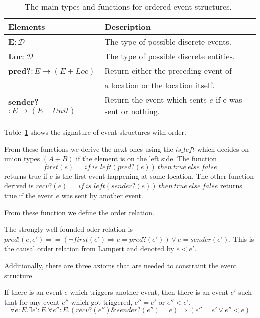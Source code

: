 \begin{table}[h]
  \centering
  \begin{tabular}{l|l}
    Elements & Description\\\hline
    \textbf{E}$:\mathcal{D}$ & The type of possible discrete events.\\
    \textbf{Loc}$:\mathcal{D}$ & The type of possible discrete entities.\\
    \textbf{pred?}$:E\rightarrow (E+Loc)$
             & Return either the preceding event of\\
             & a location or the location itself.\\
    \textbf{sender?}$:E\rightarrow (E+Unit)$
             & Return the event which sents $e$ if e was sent or nothing.\\
  \end{tabular}
  \caption{The main types and functions for ordered event structures.~\cite{bickford2005causal}}
  \label{tab:eorder}
\end{table}

Table~\ref{tab:eorder} shows the signature of event structures with order.

From these functions we derive the next ones using the $is\_left$ which decides
on union types $(A+B)$ if the element is on the left side.
The function \[first(e)=\ if\ is\_left(pred?(e))\ then\ true\ else\ false\]
returns true if $e$ is the first event happening at some location.
The other function derived is $recv?(e)=\ if\ is\_left(sender?(e))\ then\ true\
else\ false$ returns true if the event $e$ was sent by another event.~\cite{bickford2005causal}

From these function we define the order relation.

\begin{defi}
  The strongly well-founded oder relation is
  $pred!(e,e') == (\neg first(e') \Rightarrow e = pred?(e')) \vee e = sender(e')$.
  This is the causal order relation from Lampert and denoted by $e<e'$.
\end{defi}

Additionally, there are three axioms that are needed to constraint the
event structure.~\cite{bickford2005causal}

\begin{axiom}
  If there is an event $e$ which triggers another event, then there is an
  event $e'$ such that for any event $e''$ which got triggered, $e''=e'$
  or $e''<e'$.
  \[\forall e:E.\exists e':E.\forall e'':E.(recv?(e'')\&sender?(e'')=e)\Rightarrow (e''=e'\vee e''<e)\]
\end{axiom}

